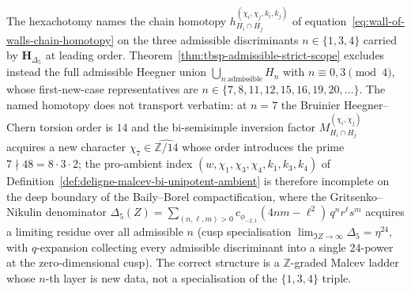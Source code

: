 The hexachotomy names the chain homotopy
$h^{(\chi_i,\chi_j,k_i,k_j)}_{H_i\cap H_j}$ of
equation~\textup{\eqref{eq:wall-of-walls-chain-homotopy}} on the three
admissible discriminants $n\in\{1,3,4\}$ carried by
$\mathbf{H}_{\Delta_5}$ at leading order.
Theorem~\textup{\ref{thm:tbsp-admissible-strict-scope}} excludes
instead the full admissible Heegner union
$\bigcup_{n\ \text{admissible}} H_n$ with $n\equiv 0,3\pmod 4$, whose
first-new-case representatives are
$n\in\{7,8,11,12,15,16,19,20,\ldots\}$. The named homotopy does not
transport verbatim: at $n=7$ the Bruinier Heegner--Chern torsion order
is $14$ and the bi-semisimple inversion factor
$M^{(\chi_i,\chi_j)}_{H_i\cap H_j}$ acquires a new character
$\chi_7\in\widehat{\mathbb Z/14}$ whose order introduces the prime
$7\nmid 48=8\cdot 3\cdot 2$; the
pro-ambient index $(w,\chi_1,\chi_3,\chi_4,k_1,k_3,k_4)$ of
Definition~\textup{\ref{def:deligne-malcev-bi-unipotent-ambient}} is
therefore incomplete on the deep boundary of the Baily--Borel
compactification, where the Gritsenko--Nikulin denominator
$\Delta_5(Z)=\sum_{(n,\ell,m)>0} c_{\phi_{-2,1}}(4nm-\ell^2)\,q^n r^\ell s^m$
acquires a limiting residue over all admissible $n$ (cusp
specialisation $\lim_{\Im Z\to\infty}\Delta_5=\eta^{24}$, with
$q$-expansion collecting every admissible discriminant into a single
$24$-power at the zero-dimensional cusp). The correct structure is a
$\mathbb Z$-graded Malcev ladder whose $n$-th layer is new data, not a
specialisation of the $\{1,3,4\}$ triple.

